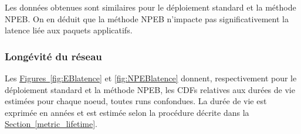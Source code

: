 \documentclass[]{report}
\newcommand{\wordlink}[2]{\hyperref[#2]{#1~\ref{#2}}}
\begin{document}
Les données obtenues sont similaires pour le déploiement standard et la méthode NPEB. On en déduit que la méthode NPEB n'impacte pas significativement la latence liée aux paquets applicatifs.

\newpage

\subsubsection{Longévité du réseau}
\label{results_lifetime}

Les \wordlink{Figures}{fig:EBlatence} et \ref{fig:NPEBlatence} donnent,  respectivement pour le déploiement standard et la méthode NPEB, les CDFs relatives aux durées de vie estimées pour chaque noeud, toutes runs confondues. La durée de vie est exprimée en années et est estimée selon la procédure décrite dans la \wordlink{Section}{metric_lifetime}.

\vspace{0.2cm}
\end{document}
